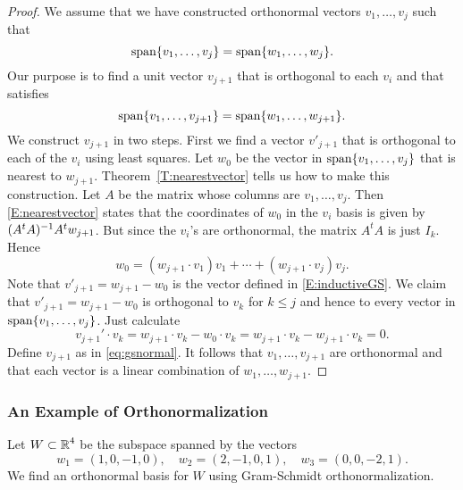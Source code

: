 \documentclass{ximera}
\begin{document}
\begin{proof}  We assume that we have constructed orthonormal vectors $v_1,\ldots,v_j$
such that
\[
{\rm span}\{v_1,\ldots,v_j\} = {\rm span}\{w_1,\ldots,w_j\}.
\]
Our purpose is to find a unit vector $v_{j+1}$ that is orthogonal to each $v_i$
and that satisfies
\[
{\rm span}\{v_1,\ldots,v_{j+1}\} = {\rm span}\{w_1,\ldots,w_{j+1}\}.
\]
We construct $v_{j+1}$ in two steps.  First we find a vector $v'_{j+1}$
that is orthogonal to each of the $v_i$ using least squares.  Let $w_0$
be the vector in ${\rm span}\{v_1,\ldots,v_j\}$ that is nearest to $w_{j+1}$.
Theorem~\ref{T:nearestvector} tells us how to make this construction.
Let $A$ be the matrix whose columns are $v_1,\ldots,v_j$.  Then
\eqref{E:nearestvector} states that the coordinates of $w_0$ in the $v_i$ basis
is given by $(A^tA)^{-1} A^tw_{j+1}$. But since the $v_i$'s are orthonormal,
the matrix $A^tA$ is just $I_k$.  Hence
\[
w_0 =  (w_{j+1}\cdot v_1)v_1 + \cdots + (w_{j+1}\cdot v_j)v_j.
\]
Note that $v'_{j+1}=w_{j+1}-w_0$ is the vector defined in \eqref{E:inductiveGS}.
We claim that $v'_{j+1}=w_{j+1}-w_0$ is orthogonal to $v_k$ for $k\leq j$
and hence to every vector in ${\rm span}\{v_1,\ldots,v_j\}$.  Just calculate
\[
v_{j+1}'\cdot v_k = w_{j+1}\cdot v_k - w_0\cdot v_k =
w_{j+1}\cdot v_k -  w_{j+1}\cdot v_k = 0.
\]
Define $v_{j+1}$ as in
\eqref{eq:gsnormal}.  It follows that $v_1,\ldots,v_{j+1}$ are orthonormal and
that each vector is a linear combination of $w_1,\ldots,w_{j+1}$.  \end{proof}


\subsubsection*{An Example of Orthonormalization}

Let $W\subset\mbox{$\mathbb{R}$}^4$ be the subspace spanned by the vectors
\begin{equation}  \label{eq:gsexam}
w_1=(1,0,-1,0),\quad w_2=(2,-1,0,1),\quad w_3=(0,0,-2,1).
\end{equation}
We find an orthonormal basis for $W$ using Gram-Schmidt orthonormalization.
\end{document}
